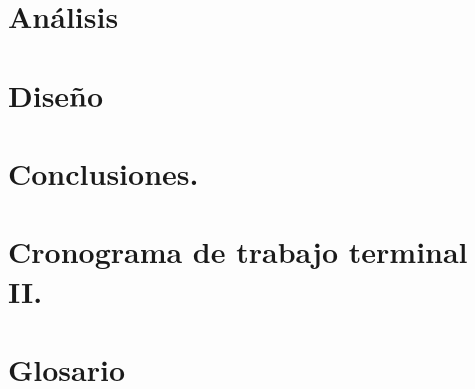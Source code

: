 \documentclass[10pt]{article}
\begin{document}
\section{Análisis}
\section{Diseño}

\section{Conclusiones.}

\section{Cronograma de trabajo terminal II.}

\section{Glosario}
\end{document}

